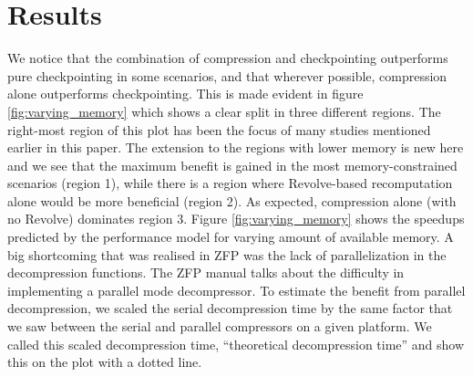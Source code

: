 \documentclass[conference]{IEEEtran}
\begin{document}
\section{Results}
We notice that the combination of compression and checkpointing
outperforms pure checkpointing in some scenarios, and that wherever
possible, compression alone outperforms checkpointing. This is made
evident in figure \ref{fig:varying_memory} which shows a clear split
in three different regions. The right-most region of this plot has
been the focus of many studies mentioned earlier in this paper. The
extension to the regions with lower memory is new here and we see that
the maximum benefit is gained in the most memory-constrained scenarios
(region 1), while there is a region where Revolve-based recomputation
alone would be more beneficial (region 2). As expected, compression
alone (with no Revolve) dominates region 3.
Figure \ref{fig:varying_memory} shows the speedups predicted by the
performance model for varying amount of available memory. A big
shortcoming that was realised in ZFP was the lack of parallelization
in the decompression functions. The ZFP manual talks about the
difficulty in implementing a parallel mode decompressor. To estimate
the benefit from parallel decompression, we scaled the serial
decompression time by the same factor that we saw between the serial
and parallel compressors on a given platform. We called this scaled
decompression time, ``theoretical decompression time'' and show this
on the plot with a dotted line. 
\end{document}
